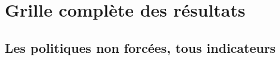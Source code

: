 ﻿\chapter{Grille complète des résultats}
\label{ann:resultats}
%
%

\section{Les politiques non forcées, tous indicateurs}

